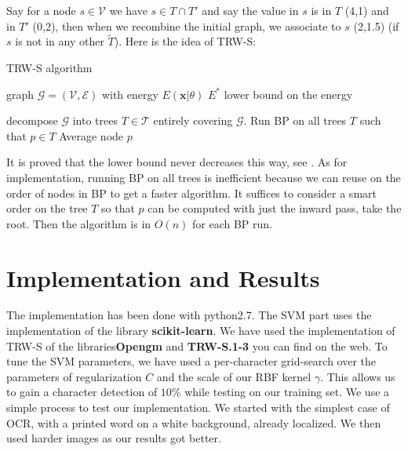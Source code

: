 \documentclass[10pt,a4paper]{article}
\begin{document}
Say for a node $s\in\mathcal{V}$ we have $s\in T \cap T'$ and say the value in $s$ is in $T$ (4,1) and in $T'$ (0,2), then when we recombine the initial graph, we associate to $s$ (2,1.5) (if $s$ is not in any other $\tilde{T}$). Here is the idea of TRW-S:
 
\begin{algorithm}
\caption{TRW-S algorithm}
\label{trws}
\begin{algorithmic}
\Require graph $\mathcal{G} = ( \mathcal{V}, \mathcal{E})$ with energy $E(\mathbf{x}|\theta)$
\Ensure $E^*$ lower bound on the energy

\State decompose $\mathcal{G}$ into trees $T\in\mathcal{T}$ entirely covering $\mathcal{G}$.
	\State Run BP on all trees $T$ such that $p\in T$
	\State Average node $p$
\EndFor
\end{algorithmic}
\end{algorithm}

It is proved that the lower bound never decreases this way, see \cite{Kol}. As for implementation, running BP on all trees is inefficient because we can reuse on the order of nodes in BP to get a faster algorithm. It suffices to consider a smart order on the tree $T$ so that $p$ can be computed with just the inward pass, take the root. Then the algorithm is in $O(n)$ for each BP run. 











\section{Implementation and Results}

The implementation has been done with python2.7. The SVM part uses the implementation of the library \textbf{scikit-learn}. We have used the implementation of TRW-S of the libraries\textbf{Opengm} and \textbf{TRW-S.1-3} you can find on the web. To tune the SVM parameters, we have used a per-character grid-search over the parameters of regularization $C$ and the scale of our RBF kernel $\gamma$. This allows us to gain a character detection of $10\%$ while testing on our training set. We use a simple process to test our implementation. We started with the simplest case of OCR, with a printed word on a white background, already localized. We then used harder images as our results got better.
\end{document}
